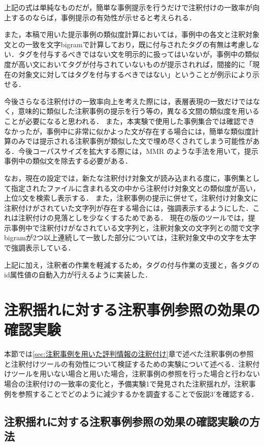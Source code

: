 \documentclass[japanese]{jnlp_1.4}
\begin{document}
上記の式は単純なものだが，簡単な事例提示を行うだけで注釈付けの一致率が向上するのならば，事例提示の有効性が示せると考えられる．

また，本稿で用いた提示事例の類似度計算においては，事例中の各文と注釈対象文との一致を文字bigramで計算しており，既に付与されたタグの有無は考慮しない．タグを付与するべきではない文を明示的に扱ってはいないが，事例中の類似度が高い文においてタグが付与されていないものが提示されれば，間接的に「現在の対象文に対してはタグを付与するべきではない」ということが例示により示せる．

今後さらなる注釈付けの一致率向上を考えた際には，表層表現の一致だけではなく，意味的に類似した注釈事例の提示を行う等の，異なる文間の類似度を用いることが必要になると思われる．
また，本実験で使用した事例集合では確認できなかったが，事例中に非常に似かよった文が存在する場合には，簡単な類似度計算のみでは提示される注釈事例が類似した文で埋め尽くされてしまう可能性がある．今後コーパスサイズを拡大する際には，MMR のような手法を用いて，提示事例中の類似文を除去する必要がある．

なお，現在の設定では，新たな注釈付け対象文が読み込まれる度に，事例集として指定されたファイルに含まれる文の中から注釈付け対象文との類似度が高い，上位5文を検索し表示する．
また，注釈事例の提示に併せて，注釈付け対象文に注釈付けがされていた文字列が存在する場合には，強調表示するようにした．これは注釈付けの見落としを少なくするためである．
現在の版のツールでは，提示事例中で注釈付けがなされている文字列と，注釈対象文の文字列との間で文字bigramが2つ以上連続して一致した部分については，注釈対象文中の文字を太字で強調表示している．

上記に加え，注釈者の作業を軽減するため，タグの付与作業の支援と，各タグのid属性値の自動入力が行えるように実装した．



\section{注釈揺れに対する注釈事例参照の効果の確認実験}
\label{sec:注釈揺れに対する注釈事例参照の効果の確認実験}

本節では\ref{sec:注釈事例を用いた評判情報の注釈付け}章で述べた注釈事例の参照と注釈付けツールの有効性について検証するための実験について述べる．注釈付けツールを用いない場合と用いた場合，注釈事例の参照を行った場合と行わない場合の注釈付けの一致率の変化と，予備実験1で発見された注釈揺れが，注釈事例を参照することでどのように減少するかを調査することで仮説3$'$を確認する．


\subsection{注釈揺れに対する注釈事例参照の効果の確認実験の方法}
\label{sec:注釈揺れに対する注釈事例参照の効果の確認実験の方法}
\end{document}
